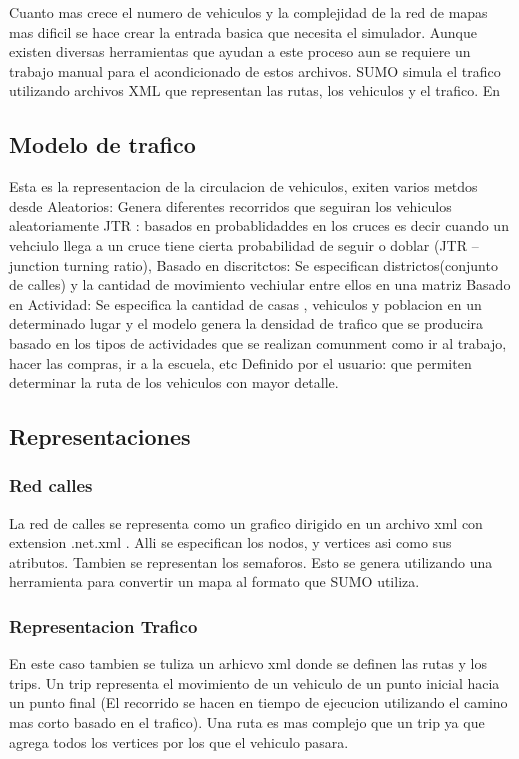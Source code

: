 Cuanto mas crece el numero de vehiculos y la complejidad de la red de mapas mas dificil se hace crear la entrada basica que necesita el simulador. Aunque existen diversas herramientas que ayudan a este proceso aun se requiere un trabajo manual para el acondicionado de estos archivos.
SUMO simula el trafico utilizando archivos XML que representan las rutas, los vehiculos y el trafico. En 

\subsection{Modelo de trafico }
Esta es la representacion de la circulacion de vehiculos, exiten varios metdos desde 
Aleatorios: Genera diferentes recorridos que seguiran los vehiculos aleatoriamente
JTR : basados en probablidaddes en los cruces  es decir cuando un vehciulo llega a un cruce tiene cierta probabilidad de seguir o doblar (JTR – junction turning ratio), 
Basado en discritctos:  Se especifican districtos(conjunto de calles) y  la cantidad de movimiento vechiular entre ellos en una  matriz
Basado en Actividad: Se especifica la cantidad de casas , vehiculos y poblacion en un determinado lugar y el modelo genera la densidad de trafico que se producira basado en los tipos de actividades que se realizan comunment como ir al trabajo, hacer las compras, ir a la escuela,  etc
Definido por el usuario: que permiten determinar la ruta de los vehiculos con mayor detalle.

\subsection{Representaciones}

\subsubsection{Red calles}
La red de calles se representa como un grafico dirigido en un archivo xml con extension .net.xml . Alli se especifican los nodos, y vertices asi como sus atributos. Tambien se representan los semaforos. Esto  se genera utilizando una herramienta  para convertir un mapa al formato que SUMO utiliza.

\subsubsection{Representacion Trafico}
En este caso tambien se tuliza un arhicvo xml donde se definen las rutas y los trips. Un trip representa el movimiento de un vehiculo de un punto inicial hacia un punto final (El recorrido se hacen en tiempo de ejecucion utilizando el camino mas corto basado en el trafico). Una ruta es mas complejo que un trip ya que agrega todos los vertices por los que el vehiculo pasara.

